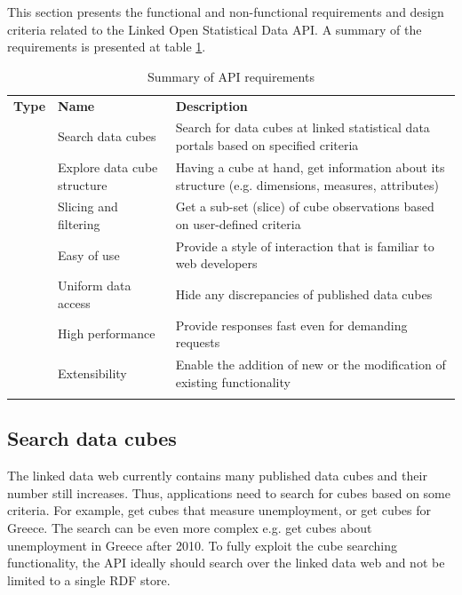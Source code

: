 \documentclass{llncs}
\begin{document}
This section presents the functional and non-functional requirements and design criteria related to the Linked Open Statistical Data API.
A summary of the requirements is presented at table \ref{tbl:req}.

\begin{table}
\caption{Summary of API requirements}
\begin{tabular}{p{2cm}p{4cm}p{5.9cm}}
\hline\noalign{\smallskip}
\textbf{Type} & \textbf{Name} & \textbf{Description}\\
\noalign{\smallskip}
\hline
\noalign{\smallskip}
\multirow{3}{*}{functional} & Search data cubes & Search for data cubes at linked statistical data portals based on specified criteria\\\noalign{\smallskip}
 & Explore data cube structure & Having a cube at hand, get information about its structure (e.g. dimensions, measures, attributes)\\\noalign{\smallskip}
 & Slicing and filtering & Get a sub-set (slice) of cube observations based on user-defined criteria\\\noalign{\smallskip}\hline
\multirow{4}{*}{non-functional} & Easy of use & Provide a style of interaction that is familiar to web developers\\\noalign{\smallskip}
 & Uniform data access & Hide any discrepancies of published data cubes\\\noalign{\smallskip}
 & High performance & Provide responses fast even for demanding requests\\\noalign{\smallskip}
 & Extensibility & Enable the addition of new or the modification of existing functionality\\\noalign{\smallskip}
\hline
\end{tabular}
\label{tbl:req}
\end{table}

\subsection{Search data cubes}\label{sec:search}

The linked data web currently contains many published data cubes and their number still increases. Thus, applications need to search for cubes based on some criteria. For example, get cubes that measure unemployment, or get cubes for Greece. The search can be even more complex e.g. get cubes about unemployment in Greece after 2010. To fully exploit the cube searching functionality, the API ideally should search over the linked data web and not be limited to a single RDF store.
\end{document}
